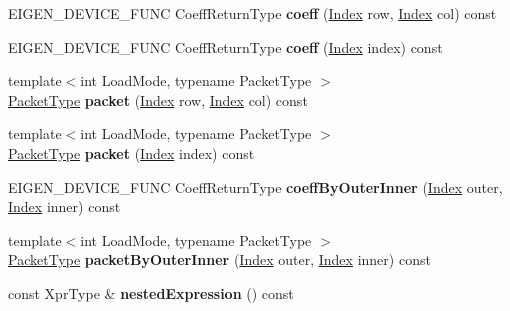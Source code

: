 \begin{DoxyCompactItemize}
\mbox{\label{class_eigen_1_1internal_1_1redux__evaluator_a55d9a4f6db1a8bce00f218a2fe304f73}} 
E\+I\+G\+E\+N\+\_\+\+D\+E\+V\+I\+C\+E\+\_\+\+F\+U\+NC Coeff\+Return\+Type {\bfseries coeff} (\hyperlink{namespace_eigen_a62e77e0933482dafde8fe197d9a2cfde}{Index} row, \hyperlink{namespace_eigen_a62e77e0933482dafde8fe197d9a2cfde}{Index} col) const
\item 
\mbox{\label{class_eigen_1_1internal_1_1redux__evaluator_ab0980858a25500e1c8fe8ce59960500a}} 
E\+I\+G\+E\+N\+\_\+\+D\+E\+V\+I\+C\+E\+\_\+\+F\+U\+NC Coeff\+Return\+Type {\bfseries coeff} (\hyperlink{namespace_eigen_a62e77e0933482dafde8fe197d9a2cfde}{Index} index) const
\item 
\mbox{\label{class_eigen_1_1internal_1_1redux__evaluator_a472d69c66fe1edee728666b67ebc401c}} 
{\footnotesize template$<$int Load\+Mode, typename Packet\+Type $>$ }\\\hyperlink{struct_eigen_1_1_packet_type}{Packet\+Type} {\bfseries packet} (\hyperlink{namespace_eigen_a62e77e0933482dafde8fe197d9a2cfde}{Index} row, \hyperlink{namespace_eigen_a62e77e0933482dafde8fe197d9a2cfde}{Index} col) const
\item 
\mbox{\label{class_eigen_1_1internal_1_1redux__evaluator_a433d7cdb229ff7568e0d68b74b87985c}} 
{\footnotesize template$<$int Load\+Mode, typename Packet\+Type $>$ }\\\hyperlink{struct_eigen_1_1_packet_type}{Packet\+Type} {\bfseries packet} (\hyperlink{namespace_eigen_a62e77e0933482dafde8fe197d9a2cfde}{Index} index) const
\item 
\mbox{\label{class_eigen_1_1internal_1_1redux__evaluator_a6d56217446293557a7b21754181fce85}} 
E\+I\+G\+E\+N\+\_\+\+D\+E\+V\+I\+C\+E\+\_\+\+F\+U\+NC Coeff\+Return\+Type {\bfseries coeff\+By\+Outer\+Inner} (\hyperlink{namespace_eigen_a62e77e0933482dafde8fe197d9a2cfde}{Index} outer, \hyperlink{namespace_eigen_a62e77e0933482dafde8fe197d9a2cfde}{Index} inner) const
\item 
\mbox{\label{class_eigen_1_1internal_1_1redux__evaluator_a438feca81b1846945bad96d2198b4bac}} 
{\footnotesize template$<$int Load\+Mode, typename Packet\+Type $>$ }\\\hyperlink{struct_eigen_1_1_packet_type}{Packet\+Type} {\bfseries packet\+By\+Outer\+Inner} (\hyperlink{namespace_eigen_a62e77e0933482dafde8fe197d9a2cfde}{Index} outer, \hyperlink{namespace_eigen_a62e77e0933482dafde8fe197d9a2cfde}{Index} inner) const
\item 
\mbox{\label{class_eigen_1_1internal_1_1redux__evaluator_ae913efcd2894bb81aa1a04369722df32}} 
const Xpr\+Type \& {\bfseries nested\+Expression} () const
\end{DoxyCompactItemize}
